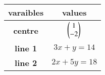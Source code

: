 \begin{tabular}{|c|c|}
\hline
\textbf{varaibles} & \textbf{values}\\
\hline
\textbf{centre} & $\begin{pmatrix}1\\-2\end{pmatrix}$\\
\hline
\textbf{line 1} & $3x + y = 14$\\
\hline
\textbf{line 2} & $2x + 5y = 18$\\
\hline
\end{tabular}
